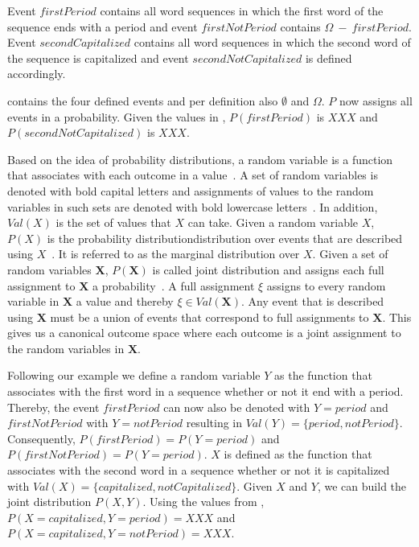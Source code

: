 Event $firstPeriod$ contains all word sequences in which the first word of the sequence ends with a period and event $firstNotPeriod$ contains $\Omega\ -\ firstPeriod$.
Event $secondCapitalized$ contains all word sequences in which the second word of the sequence is capitalized and event $secondNotCapitalized$ is defined accordingly.

 contains the four defined events and per definition also $\emptyset$ and $\Omega$.
$P$ now assigns all events in  a probability.
Given the values in , $P(firstPeriod)$ is $XXX$ and $P(secondNotCapitalized)$ is $XXX$.

\bigskip

Based on the idea of \glspl{probability distribution}, a \gls{random variable} is a \gls{function} that associates with each outcome in  a value~\cite{koller2009probabilistic}.
A set of \glspl{random variable} is denoted with bold capital letters and assignments of values to the \glspl{random variable} in such sets are denoted with bold lowercase letters~\cite{koller2009probabilistic}.
In addition, $Val(X)$ is the set of values that $X$ can take.
Given a \gls{random variable} $X$, $P(X)$ is the \gls{probability distribution}{distribution} over \glspl{event} that are described using $X$~\cite{koller2009probabilistic}.
It is referred to as the \gls{marginal distribution} over $X$.
Given a set of \glspl{random variable} $\bm{X}$, $P(\bm{X})$ is called \gls{joint distribution} and assigns each \gls{full assignment} to $\bm{X}$ a probability~\cite{koller2009probabilistic}.
A \gls{full assignment} $\xi$ assigns to every \gls{random variable} in $\bm{X}$ a value and thereby $\xi\in Val(\bm{X})$.
Any \gls{event} that is described using $\bm{X}$ must be a union of events that correspond to \glspl{full assignment} to $\bm{X}$.
This gives us a \gls{canonical outcome space} where each outcome is a joint assignment to the \glspl{random variable} in $\bm{X}$.

Following our example we define a \gls{random variable} $Y$ as the \gls{function} that associates with the first word in a sequence whether or not it end with a period.
Thereby, the \gls{event} $firstPeriod$ can now also be denoted with $Y = period$ and $firstNotPeriod$ with $Y = notPeriod$ resulting in $Val(Y)=\{period, notPeriod\}$.
Consequently, $P(firstPeriod)=P(Y=period)$ and $P(firstNotPeriod)=P(Y=period)$.
$X$ is defined as the function that associates with the second word in a sequence whether or not it is capitalized with $Val(X)=\{capitalized, notCapitalized\}$.
Given $X$ and $Y$, we can build the \gls{joint distribution} $P(X,Y)$.
Using the values from , $P(X=capitalized,Y=period)=XXX$ and $P(X=capitalized,Y=notPeriod)=XXX$.

